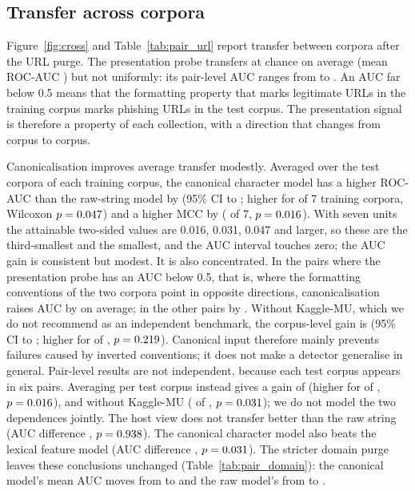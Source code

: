 

\subsection{Transfer across corpora}
\label{sec:cross}
Figure~\ref{fig:cross} and Table~\ref{tab:pair_url} report transfer between corpora after the URL purge. The presentation probe transfers at chance on average (mean ROC-AUC \XUrlPresentationMeanAUC) but not uniformly: its pair-level AUC ranges from \XUrlPresentationMinAUC{} to \XUrlPresentationMaxAUC. An AUC far below 0.5 means that the formatting property that marks legitimate URLs in the training corpus marks phishing URLs in the test corpus. The presentation signal is therefore a property of each collection, with a direction that changes from corpus to corpus.

Canonicalisation improves average transfer modestly. Averaged over the test corpora of each training corpus, the canonical character model has a higher ROC-AUC than the raw-string model by \XTUrlCharCanonMinusCharRawAucCorpus{} (95\% CI \XTUrlCharCanonMinusCharRawAucCorpusLo{} to \XTUrlCharCanonMinusCharRawAucCorpusHi; higher for \XTUrlCharCanonMinusCharRawAucCorpusBetter{} of 7 training corpora, Wilcoxon $p=0.047$) and a higher MCC by \XTUrlCharCanonMinusCharRawMccCorpus{} (\XTUrlCharCanonMinusCharRawMccCorpusBetter{} of 7, $p=0.016$). With seven units the attainable two-sided values are 0.016, 0.031, 0.047 and larger, so these are the third-smallest and the smallest, and the AUC interval touches zero; the AUC gain is consistent but modest. It is also concentrated. In the \XInvN{} pairs where the presentation probe has an AUC below 0.5, that is, where the formatting conventions of the two corpora point in opposite directions, canonicalisation raises AUC by \XInvGain{} on average; in the other \XOthN{} pairs by \XOthGain. Without Kaggle-MU, which we do not recommend as an independent benchmark, the corpus-level gain is \XNoKGain{} (95\% CI \XNoKLo{} to \XNoKHi; higher for \XNoKBetter{} of \XNoKN, $p=0.219$). Canonical input therefore mainly prevents failures caused by inverted conventions; it does not make a detector generalise in general. Pair-level results are not independent, because each test corpus appears in six pairs. Averaging per test corpus instead gives a gain of \XByTestGain{} (higher for \XByTestBetter{} of \XByTestN, $p=0.016$), and \XByTestNoKGain{} without Kaggle-MU (\XByTestNoKBetter{} of \XByTestNoKN, $p=0.031$); we do not model the two dependences jointly. The host view does not transfer better than the raw string (AUC difference \XTUrlCharHostMinusCharRawAucCorpus, $p=0.938$). The canonical character model also beats the lexical feature model (AUC difference \XTUrlCharCanonMinusLexicalAucCorpus, $p=0.031$). The stricter domain purge leaves these conclusions unchanged (Table~\ref{tab:pair_domain}): the canonical model's mean AUC moves from \XUrlCharCanonMeanAUC{} to \XDomainCharCanonMeanAUC{} and the raw model's from \XUrlCharRawMeanAUC{} to \XDomainCharRawMeanAUC.

